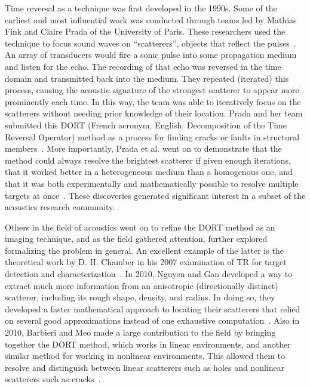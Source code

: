 Time reversal as a technique was first developed in the 1990s. Some of the earliest and most influential work was conducted through teams led by Mathias Fink and Claire Prada of the University of Paris. These researchers used the technique to focus sound waves on ``scatterers'', objects that reflect the pulses~\cite{prada_iterative_1991}. An array of transducers would fire a sonic pulse into some propagation medium and listen for the echo. The recording of that echo was reversed in the time domain and transmitted back into the medium. They repeated (iterated) this process, causing the acoustic signature of the strongest scatterer to appear more prominently each time. In this way, the team was able to iteratively focus on the scatterers without needing prior knowledge of their location. Prada and her team submitted this DORT (French acronym, English: Decomposition of the Time Reversal Operator) method as a process for finding cracks or faults in structural members~\cite{prada_iterative_1991}. More importantly, Prada et al. went on to demonstrate that the method could always resolve the brightest scatterer if given enough iterations, that it worked better in a heterogeneous medium than a homogenous one, and that it was both experimentally and mathematically possible to resolve multiple targets at once~\cite{prada_decomposition_1996}. These discoveries generated significant interest in a subset of the acoustics research community.

Others in the field of acoustics went on to refine the DORT method as an imaging technique, and as the field gathered attention, further explored formalizing the problem in general. An excellent example of the latter is the theoretical work by D. H. Chamber in his 2007 examination of TR for target detection and characterization~\cite{chambers_target_2007}. In 2010, Nguyen and Gan developed a way to extract much more information from an anisotropic (directionally distinct) scatterer, including its rough shape, density, and radius. In doing so, they developed a faster mathematical approach to locating their scatterers that relied on several good approximations instead of one exhaustive computation~\cite{nguyen_dort_2010}. Also in 2010, Barbieri and Meo made a large contribution to the field by bringing together the DORT method, which works in linear environments, and another similar method for working in nonlinear environments. This allowed them to resolve and distinguish between linear scatterers such as holes and nonlinear scatterers such as cracks~\cite{barbieri_time_2010}.

